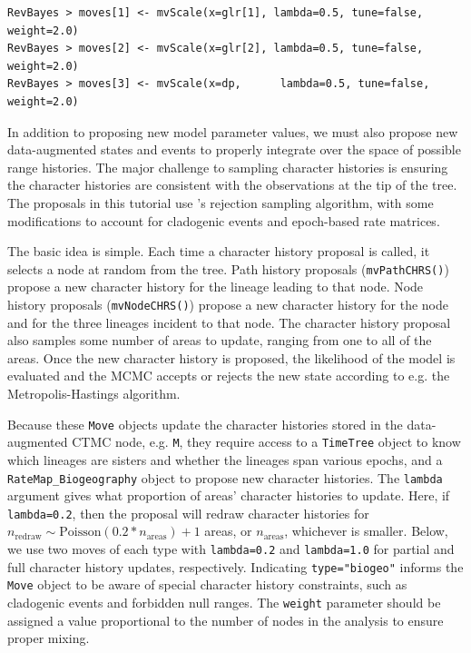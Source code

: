 \documentclass[11pt]{article}
\begin{document}
\begin{snugshade}
\begin{lstlisting}
RevBayes > moves[1] <- mvScale(x=glr[1], lambda=0.5, tune=false, weight=2.0)
RevBayes > moves[2] <- mvScale(x=glr[2], lambda=0.5, tune=false, weight=2.0)
RevBayes > moves[3] <- mvScale(x=dp, 	  lambda=0.5, tune=false, weight=2.0)
\end{lstlisting}
\end{snugshade}

In addition to proposing new model parameter values, we must also propose new data-augmented states and events to properly integrate over the space of possible range histories.
The major challenge to sampling character histories is ensuring the character histories are consistent with the observations at the tip of the tree.
The proposals in this tutorial use \citet{nielsen02}'s rejection sampling algorithm, with some modifications to account for cladogenic events and epoch-based rate matrices.

The basic idea is simple.
Each time a character history proposal is called, it selects a node at random from the tree.
Path history proposals ({\tt mvPathCHRS()}) propose a new character history for the lineage leading to that node.
Node history proposals ({\tt mvNodeCHRS()}) propose a new character history for the node and for the three lineages incident to that node.
The character history proposal also samples some number of areas to update, ranging from one to all of the areas.
Once the new character history is proposed, the likelihood of the model is evaluated and the MCMC accepts or rejects the new state according to e.g. the Metropolis-Hastings algorithm.

Because these {\tt Move} objects update the character histories stored in the data-augmented CTMC node, e.g. {\tt M},
they require access to a {\tt TimeTree} object to know which lineages are sisters and whether the lineages span various epochs, and a {\tt RateMap\_Biogeography} object to propose new character histories.
The {\tt lambda} argument gives what proportion of areas' character histories to update.
Here, if {\tt lambda=0.2}, then the proposal will redraw character histories for $n_{\text{redraw}} \sim \text{Poisson}(0.2 * n_{\text{areas}}) + 1$ areas, or $n_{\text{areas}}$, whichever is smaller.
Below, we use two moves of each type with {\tt lambda=0.2} and {\tt lambda=1.0} for partial and full character history updates, respectively.
Indicating {\tt type="biogeo"} informs the {\tt Move} object to be aware of special character history constraints, such as cladogenic events and forbidden null ranges.
The {\tt weight} parameter should be assigned a value proportional to the number of nodes in the analysis to ensure proper mixing.
\end{document}
